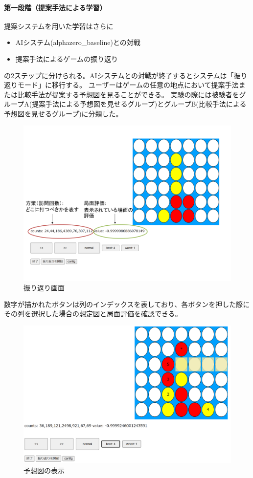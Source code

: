 \paragraph{第一段階（提案手法による学習）}
提案システムを用いた学習はさらに
\begin{itemize}
	\item AIシステム(alphazero\_baseline)との対戦
	\item 提案手法によるゲームの振り返り
\end{itemize}
の2ステップに分けられる。AIシステムとの対戦が終了するとシステムは「振り返りモード」に移行する。
ユーザーはゲームの任意の地点において提案手法または比較手法が提案する予想図を見ることができる。
実験の際には被験者をグループA(提案手法による予想図を見せるグループ)とグループB(比較手法による予想図を見せるグループ)に分類した。
\begin{figure}[t]
	\centering
	\includegraphics[width=\linewidth]{./figure/lookBack.png}
	\caption{振り返り画面}
	\label{fig:lookBack}
\end{figure}
数字が描かれたボタンは列のインデックスを表しており、各ボタンを押した際にその列を選択した場合の想定図と局面評価を確認できる。
\begin{figure}[t]
	\centering
	\includegraphics[width=\linewidth]{./figure/trajSystem.png}
	\caption{予想図の表示}
	\label{fig:trajSystem}
\end{figure}
